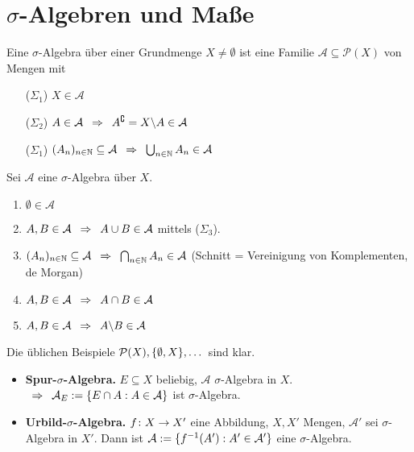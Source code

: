 \documentclass[a4paper, 11pt, ngerman]{scrartcl}
\begin{document}
\setlength\abovedisplayshortskip{3pt}
\setlength\belowdisplayshortskip{3pt}
\setlength\abovedisplayskip{3pt}
\setlength\belowdisplayskip{3pt}

\section{$\sigma$-Algebren und Maße}
\begin{defin}
	Eine $\sigma$-Algebra über einer Grundmenge $X\neq \emptyset$ ist eine Familie $\mathcal{A} \subseteq \mathcal{P}(X)$ von Mengen mit
	\begin{itemize}[noitemsep]
		\item[($\Sigma_1$)] $X \in \mathcal{A}$
		\item[($\Sigma_2$)] $A \in \mathcal{A} \enspace \Rightarrow \enspace A^\complement = X \backslash A \in \mathcal{A}$
		\item[($\Sigma_1$)] $(A_n)_{n \in \mathbb{N}} \subseteq \mathcal{A} \enspace \Rightarrow \enspace \bigcup_{n \in \mathbb{N}}{A_n} \in \mathcal{A}$
	\end{itemize}
\end{defin}
\begin{satz}
	Sei $\mathcal{A}$ eine $\sigma$-Algebra über $X$.
	\begin{enumerate}
		\item $\emptyset \in \mathcal{A}$
		\item $A,B \in \mathcal{A} \enspace \Rightarrow \enspace A \cup B \in \mathcal{A}$ mittels ($\Sigma_3$).
		\item $(A_n)_{n \in \mathbb{N}} \subseteq \mathcal{A} \enspace \Rightarrow \enspace \bigcap_{n \in \mathbb{N}}{A_n} \in \mathcal{A}$ (Schnitt = Vereinigung von Komplementen, de Morgan)
		\item $A,B \in \mathcal{A} \enspace \Rightarrow \enspace A \cap B \in \mathcal{A}$
		\item $A,B \in \mathcal{A} \enspace \Rightarrow \enspace A \backslash B \in \mathcal{A}$
	\end{enumerate}
\end{satz}

\begin{bsp}
	Die üblichen Beispiele $\mathcal{P}(X), \{ \emptyset, X \}, \dots$ sind klar.
	\begin{itemize}
		\item \textbf{Spur-$\sigma$-Algebra.} $E \subseteq X$ beliebig, $\mathcal{A}$ $\sigma$-Algebra in $X$. $\enspace \Rightarrow \enspace \mathcal{A}_{E} := \{ E \cap A : A \in \mathcal{A} \}$ ist $\sigma$-Algebra.
		\item \textbf{Urbild-$\sigma$-Algebra.} $f \colon X \to X'$ eine Abbildung, $X,X'$ Mengen, $\mathcal{A}'$ sei $\sigma$-Algebra in $X'$. Dann ist $\mathcal{A} := \{ f^{-1}(A') : A' \in \mathcal{A}' \}$ eine $\sigma$-Algebra.
	\end{itemize}
\end{bsp}
\end{document}
